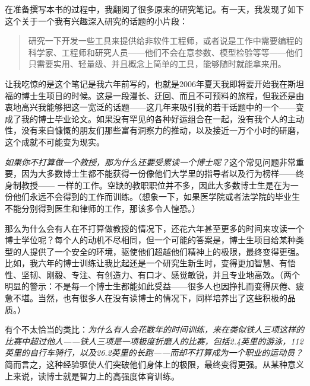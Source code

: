 \documentclass[12pt,UTF8,nofonts]{book}
\begin{document}
\breakline

在准备撰写本书的过程中，我翻阅了很多原来的研究笔记。有一天，我发现了如下这个关于一个我有兴趣深入研究的话题的小片段：
\begin{quote}
  研究一下开发一些工具来提供给非软件工程师，或者说是工作中需要编程的科学家、工程师和研究人员——他们不会在意参数、模型检验等等——他们只需要实用、轻量级、并且概念上简单的工具，能够随时就能拿来用。
\end{quote}
让我吃惊的是这个笔记是我六年前写的，也就是2006年夏天我即将要开始我在斯坦福的博士生项目的时候。这是一段漫长、迂回、而且不可预料的旅程，但我还是由衷地高兴我能够把这一宽泛的话题——这几年来吸引我的若干话题中的一个——变成了我的博士毕业论文。如果没有罕见的各种好运组合在一起，没有我个人的主动性，没有来自慷慨的朋友们那些富有洞察力的推动，以及接近一万个小时的研磨，这个成就不可能变为现实。

\emph{如果你不打算做一个教授，那为什么还要受累读一个博士呢？}这个常见问题非常重要，因为大多数博士生都不能获得一份像他们大学里的指导者以及行为榜样——终身制教授—— 一样的工作。空缺的教职职位并不多，因此大多数博士生是在为一份他们永远不会得到的工作而训练。（想象一下，如果医学院或者法学院的毕业生不能分别得到医生和律师的工作，那该多令人惶恐。）

那么为什么会有人在不打算做教授的情况下，还花六年甚至更多的时间来攻读一个博士学位呢？每个人的动机不尽相同，但一个可能的答案是，博士生项目给某种类型的人提供了一个安全的环境，驱使他们超越他们精神上的极限，最终变得更强。比如，我六年的博士训练让我比起还是一个研究生新生时，变得更加智慧、有悟性、坚韧、刚毅、专注、有创造力、有口才、感觉敏锐，并且专业地高效。（两个明显的警示：不是每一个博士生都能如此受益——很多人也因挣扎而变得厌倦、疲惫不堪。当然，也有很多人在没有读博士的情况下，同样培养出了这些积极的品质。）

有个不太恰当的类比：\emph{为什么有人会花数年的时间训练，来在类似铁人三项这样的比赛中超过他人——铁人三项是一项极度折磨人的比赛，包括2.4英里的游泳，112英里的自行车骑行，以及26.2英里的长跑——而却不打算成为一个职业的运动员？}简而言之，这种经验驱使人们突破他们身体上的极限，最终变得更强。从某种意义上来说，读博士就是智力上的高强度体育训练。

\breakline
\end{document}
